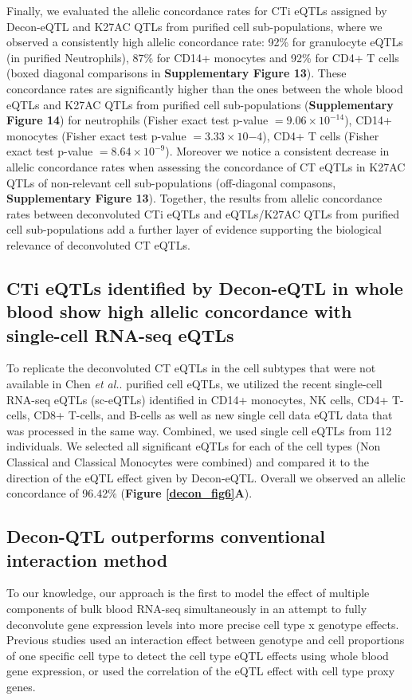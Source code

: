 Finally, we evaluated the allelic concordance rates for CTi eQTLs assigned by Decon-eQTL and K27AC QTLs from purified cell sub-populations, where we observed a consistently high allelic concordance rate: 92\% for granulocyte eQTLs (in purified Neutrophils), 87\% for CD14+ monocytes and 92\% for CD4+ T cells (boxed diagonal comparisons in \textbf{Supplementary Figure 13}). These concordance rates are significantly higher than the ones between the whole blood eQTLs and K27AC QTLs from purified cell sub-populations (\textbf{Supplementary Figure 14}) for neutrophils (Fisher exact test p-value $= 9.06 \times 10^{-14}$), CD14+ monocytes (Fisher exact test p-value $= 3.33 \times 10{-4}$), CD4+ T cells (Fisher exact test p-value $= 8.64 \times 10^{-9}$). Moreover we notice a consistent decrease in allelic concordance rates when assessing the concordance of CT eQTLs in K27AC QTLs of non-relevant cell sub-populations (off-diagonal compasons, \textbf{Supplementary Figure 13}). Together, the results from allelic concordance rates between deconvoluted CTi eQTLs and eQTLs/K27AC QTLs from purified cell sub-populations add a further layer of evidence supporting the biological relevance of deconvoluted CT eQTLs.

\subsection{CTi eQTLs identified by Decon-eQTL in whole blood show high allelic concordance with single-cell RNA-seq eQTLs}
To replicate the deconvoluted CT eQTLs in the cell subtypes that were not available in Chen \emph{et al.}\cite{chenGeneticDriversEpigenetic2016}. purified cell eQTLs, we utilized the recent single-cell RNA-seq eQTLs (sc-eQTLs) identified in CD14+ monocytes, NK cells, CD4+ T-cells, CD8+ T-cells, and B-cells\cite{wijstSinglecellRNASequencing2018} as well as new single cell data eQTL data that was processed in the same way. Combined, we used single cell eQTLs from 112 individuals. We selected all significant eQTLs for each of the cell types (Non Classical and Classical Monocytes were combined) and compared it to the direction of the eQTL effect given by Decon-eQTL. Overall we observed an allelic concordance of 96.42\% (\textbf{Figure \ref{decon_fig6}A}).

\subsection{Decon-QTL outperforms conventional interaction method}
To our knowledge, our approach is the first to model the effect of multiple components of bulk blood RNA-seq simultaneously in an attempt to fully deconvolute gene expression levels into more precise cell type x genotype effects. Previous studies used an interaction effect between genotype and cell proportions of one specific cell type to detect the cell type eQTL effects using whole blood gene expression\cite{westraCellSpecificEQTL2015}, or used the correlation of the eQTL effect with cell type proxy genes\cite{zhernakovaIdentificationContextdependentExpression2017}. 

